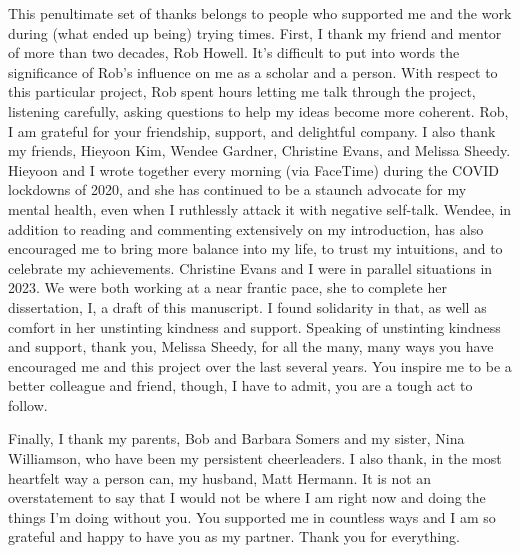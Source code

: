 This penultimate set of thanks belongs to people who supported me and the work during (what ended up being) trying times. First, I thank my friend and mentor of more than two decades, Rob Howell. It’s difficult to put into words the significance of Rob’s influence on me as a scholar and a person. With respect to this particular project, Rob spent hours letting me talk through the project, listening carefully, asking questions to help my ideas become more coherent. Rob, I am grateful for your friendship, support, and delightful company. I also thank my friends, Hieyoon Kim, Wendee Gardner, Christine Evans, and Melissa Sheedy. Hieyoon and I wrote together every morning (via FaceTime) during the COVID lockdowns of 2020, and she has continued to be a staunch advocate for my mental health, even when I ruthlessly attack it with negative self-talk. Wendee, in addition to reading and commenting extensively on my introduction, has also encouraged me to bring more balance into my life, to trust my intuitions, and to celebrate my achievements. Christine Evans and I were in parallel situations in 2023. We were both working at a near frantic pace, she to complete her dissertation, I, a draft of this manuscript. I found solidarity in that, as well as comfort in her unstinting kindness and support. Speaking of unstinting kindness and support, thank you, Melissa Sheedy, for all the many, many ways you have encouraged me and this project over the last several years. You inspire me to be a better colleague and friend, though, I have to admit, you are a tough act to follow.

Finally, I thank my parents, Bob and Barbara Somers and my sister, Nina Williamson, who have been my persistent cheerleaders. I also thank, in the most heartfelt way a person can, my husband, Matt Hermann. It is not an overstatement to say that I would not be where I am right now and doing the things I’m doing without you. You supported me in countless ways and I am so grateful and happy to have you as my partner. Thank you for everything.
